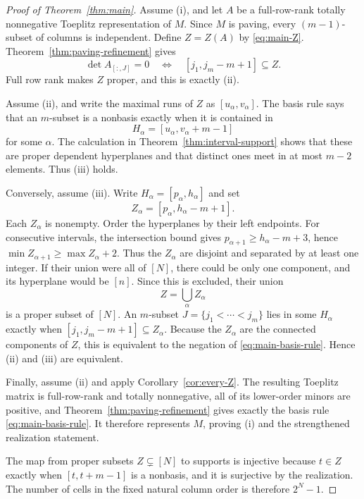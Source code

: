 \documentclass{amsart}
\numberwithin{equation}{section}
\theoremstyle{definition}
\theoremstyle{remark}
\begin{document}
\begin{proof}[Proof of Theorem~\ref{thm:main}]
Assume (i), and let $A$ be a full-row-rank totally nonnegative Toeplitz representation of $M$.  Since $M$ is paving, every $(m-1)$-subset of columns is independent.  Define $Z=Z(A)$ by \eqref{eq:main-Z}.  Theorem~\ref{thm:paving-refinement} gives
\[
 \det A_{[:,J]}=0
 \quad\Longleftrightarrow\quad
 [j_1,j_m-m+1]\subseteq Z.
\]
Full row rank makes $Z$ proper, and this is exactly (ii).

Assume (ii), and write the maximal runs of $Z$ as $[u_\alpha,v_\alpha]$.  The basis rule says that an $m$-subset is a nonbasis exactly when it is contained in
\[
 H_\alpha=[u_\alpha,v_\alpha+m-1]
\]
for some $\alpha$.  The calculation in Theorem~\ref{thm:interval-support} shows that these are proper dependent hyperplanes and that distinct ones meet in at most $m-2$ elements.  Thus (iii) holds.

Conversely, assume (iii).  Write $H_\alpha=[p_\alpha,h_\alpha]$ and set
\[
 Z_\alpha=[p_\alpha,h_\alpha-m+1].
\]
Each $Z_\alpha$ is nonempty.  Order the hyperplanes by their left endpoints.  For consecutive intervals, the intersection bound gives $p_{\alpha+1}\ge h_\alpha-m+3$, hence $\min Z_{\alpha+1}\ge\max Z_\alpha+2$.  Thus the $Z_\alpha$ are disjoint and separated by at least one integer.  If their union were all of $[N]$, there could be only one component, and its hyperplane would be $[n]$.  Since this is excluded, their union
\[
 Z=\bigcup_\alpha Z_\alpha
\]
is a proper subset of $[N]$.  An $m$-subset $J=\{j_1<\cdots<j_m\}$ lies in some $H_\alpha$ exactly when $[j_1,j_m-m+1]\subseteq Z_\alpha$.  Because the $Z_\alpha$ are the connected components of $Z$, this is equivalent to the negation of \eqref{eq:main-basis-rule}.  Hence (ii) and (iii) are equivalent.

Finally, assume (ii) and apply Corollary~\ref{cor:every-Z}.  The resulting Toeplitz matrix is full-row-rank and totally nonnegative, all of its lower-order minors are positive, and Theorem~\ref{thm:paving-refinement} gives exactly the basis rule \eqref{eq:main-basis-rule}.  It therefore represents $M$, proving (i) and the strengthened realization statement.

The map from proper subsets $Z\subsetneq[N]$ to supports is injective because $t\in Z$ exactly when $[t,t+m-1]$ is a nonbasis, and it is surjective by the realization.  The number of cells in the fixed natural column order is therefore $2^N-1$.
\end{proof}
\end{document}
